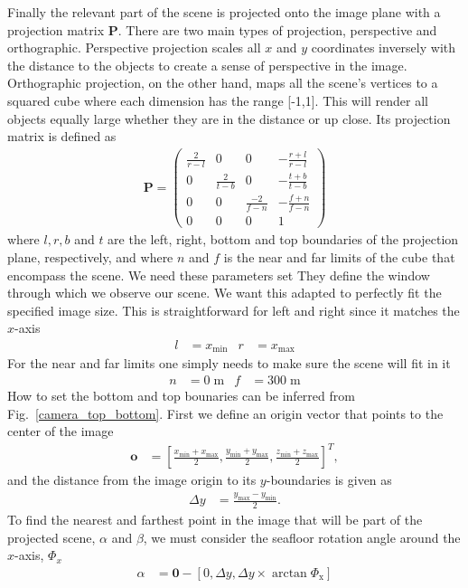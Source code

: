 \documentclass[12pt,journal,draftclsnofoot,onecolumn]{IEEEtran}
\newcommand\Fig[1]{Fig.~\ref{#1}}
\newcommand\T{^{\scriptscriptstyle T}}
\renewcommand\vec[1]{\boldsymbol{#1}}
\newcommand\mat[1]{\boldsymbol{#1}}
\newcommand\1{\vec 1}
\renewcommand*\P{\mat P}
\renewcommand*\P{\mat P}
\begin{document}
Finally the relevant part of the scene is projected onto the image plane with a projection matrix $\P$. There are two main types of projection, perspective and orthographic. Perspective projection scales all $x$ and $y$ coordinates inversely with the distance to the objects to create a sense of perspective in the image. Orthographic projection, on the other hand, maps all the scene's vertices to a squared cube where each dimension has the range [-1,1]. This will render all objects equally large whether they are in the distance or up close. Its projection matrix is defined as
\begin{align}
\P = \left(\begin{matrix}
\frac{2}{r-l}  &  0              &  0              &  -\frac{r+l}{r-l} \\
0              &  \frac{2}{t-b}  &  0              &  -\frac{t+b}{t-b} \\
0              &  0              &  \frac{-2}{f-n} &  -\frac{f+n}{f-n} \\
0              &  0              &  0              &  1
\end{matrix}\right)
\end{align}
where $l,r,b$ and $t$ are the left, right, bottom and top boundaries of the projection plane, respectively, and where $n$ and $f$ is the near and far limits of the cube that encompass the scene. We need these parameters set They define the window through which we observe our scene. We want this adapted to perfectly fit the specified image size. This is straightforward for left and right since it matches the $x$-axis
\begin{align}
l &= x_\text{min}  &  r &= x_\text{max}
\end{align}
For the near and far limits one simply needs to make sure the scene will fit in it
\begin{align}
n &= 0\;\text{m}   &  f &= 300\;\text{m} 
\end{align}
How to set the bottom and top bounaries can be inferred from \Fig{camera_top_bottom}. First we define an origin vector that points to the center of the image
\begin{align}
\vec o &= \left[\frac{x_\text{min}+x_\text{max}}{2}, \frac{y_\text{min}+y_\text{max}}{2}, \frac{z_\text{min}+z_\text{max}}{2} \right]\T,
\end{align}
and the distance from the image origin to its $y$-boundaries is given as
\begin{align}
\Delta y &= \frac{y_\text{max} - y_\text{min}}{2}.
\end{align}
To find the nearest and farthest point in the image that will be part of the projected scene, $\alpha$ and $\beta$, we must consider the seafloor rotation angle around the $x$-axis, $\Phi_x$ 
\begin{align}
\alpha &= \vec 0 - \left[0, \Delta y, \Delta y \times \arctan\Phi_\text{x} \right]
\end{align}
\end{document}
